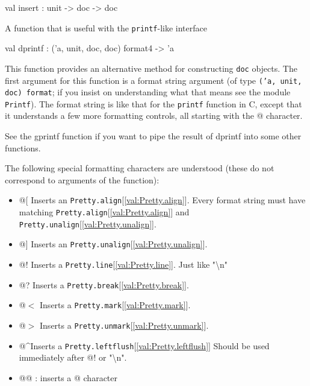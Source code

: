 \documentclass[11pt]{article}
\begin{document}
\label{val:Pretty.insert}\begin{ocamldoccode}
val insert : unit -> doc -> doc
\end{ocamldoccode}
\begin{ocamldocdescription}
A function that is useful with the {\tt{printf}}-like interface


\end{ocamldocdescription}




\label{val:Pretty.dprintf}\begin{ocamldoccode}
val dprintf : ('a, unit, doc, doc) format4 -> 'a
\end{ocamldoccode}
\begin{ocamldocdescription}
This function provides an alternative method for constructing 
    {\tt{doc}} objects. The first argument for this function is a format string 
    argument (of type {\tt{('a, unit, doc) format}}; if you insist on 
    understanding what that means see the module {\tt{Printf}}). The format string 
    is like that for the {\tt{printf}} function in C, except that it understands a 
    few more formatting controls, all starting with the @ character. 


    See the gprintf function if you want to pipe the result of dprintf into 
    some other functions.


 The following special formatting characters are understood (these do not 
 correspond to arguments of the function):\begin{itemize}
\item  @[ Inserts an {\tt{Pretty.align}}[\ref{val:Pretty.align}]. Every format string must have matching 
        {\tt{Pretty.align}}[\ref{val:Pretty.align}] and {\tt{Pretty.unalign}}[\ref{val:Pretty.unalign}]. 
\item  @] Inserts an {\tt{Pretty.unalign}}[\ref{val:Pretty.unalign}].
\item  @!  Inserts a {\tt{Pretty.line}}[\ref{val:Pretty.line}]. Just like "{\textbackslash}n"
\item  @?  Inserts a {\tt{Pretty.break}}[\ref{val:Pretty.break}].
\item  @$<$  Inserts a {\tt{Pretty.mark}}[\ref{val:Pretty.mark}]. 
\item  @$>$  Inserts a {\tt{Pretty.unmark}}[\ref{val:Pretty.unmark}].
\item  @\textasciicircum   Inserts a {\tt{Pretty.leftflush}}[\ref{val:Pretty.leftflush}]
       Should be used immediately after @! or "{\textbackslash}n".
\item  @@ : inserts a @ character
\end{itemize}


\end{ocamldocdescription}
\end{document}
